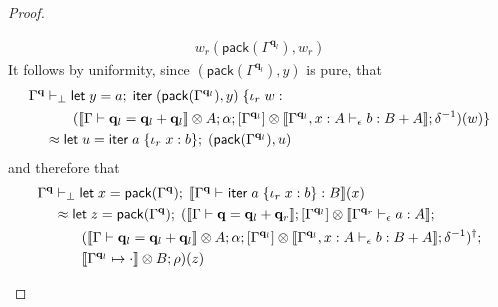 \documentclass[acmsmall,screen,anonymous,review]{acmart}
\newcommand{\mb}[1]{\ensuremath{\mathbf{#1}}}
\newcommand{\ms}[1]{\ensuremath{\mathsf{#1}}}
\newcommand{\lto}{:}
\newcommand{\linr}[1]{\iota_r\;{#1}}
\newcommand{\letexpr}[3]{\ensuremath{\ms{let}\;#1 = #2;\;#3}}
\newcommand{\liter}[3]{\ms{iter}\;#1\;\{ \linr{#2} \lto #3 \}}
\newcommand{\qsp}[4]{#1 \vdash #2 = #3 + #4}
\newcommand{\cwk}[2]{#1 \mapsto #2}
\newcommand{\hasty}[4]{#1 \vdash_{#2} #3: {#4}}
\newcommand{\dnt}[1]{\llbracket{#1}\rrbracket}
\begin{document}
\begin{proof}
\begin{itemize}
\begin{align*}
                       {w_r}{(\ms{pack}(\Gamma^{\mb{q}_l}), w_r)}
    \end{align*}
    It follows by uniformity, since $(\ms{pack}(\Gamma^{\mb{q}_l}), y)$ is pure, that
    \begin{align*}
      \Gamma^{\mb{q}} &\vdash_\bot
      \letexpr{y}{a}{\liter{(\ms{pack}(\Gamma^{\mb{q}_l}), y)}{w}{ \\ & \qquad
        (
          \dnt{\qsp{\Gamma}{\mb{q}_l}{\mb{q}_l}{\mb{q}_l}} \otimes A 
          ; \alpha
          ; [\Gamma^{\mb{q}_l}] 
            \otimes \dnt{\hasty{\Gamma^{\mb{q}_l}, x : A}{\epsilon}{b}{B + A}}
          ; \delta^{-1}
        )(w)
      }} \\
      &\approx
      \letexpr{u}{\liter{a}{x}{b}}{(\ms{pack}(\Gamma^{\mb{q}_l}), u)}
    \end{align*}
    and therefore that
    \begin{align*}
    \Gamma^{\mb{q}} &\vdash_\bot
      \letexpr{x}{\ms{pack}(\Gamma^{\mb{q}})}{\dnt{\hasty{\Gamma^{\mb{q}}}{}{\liter{a}{x}{b}}{B}}(x)}
      \\ &\approx 
      \letexpr{z}{\ms{pack}(\Gamma^{\mb{q}})}
        {(
          \dnt{\qsp{\Gamma}{\mb{q}}{\mb{q}_l}{\mb{q}_r}}
          ; [\Gamma^{\mb{q}_l}] \otimes \dnt{\hasty{\Gamma^{\mb{q}_r}}{\epsilon}{a}{A}}
          ;
      \\ & \qquad    
        (
          \dnt{\qsp{\Gamma}{\mb{q}_l}{\mb{q}_l}{\mb{q}_l}} \otimes A 
          ; \alpha
          ; [\Gamma^{\mb{q}_l}] 
            \otimes \dnt{\hasty{\Gamma^{\mb{q}_l}, x : A}{\epsilon}{b}{B + A}}
          ; \delta^{-1}
        )^\dagger  
        ;
      \\ & \qquad
        \dnt{\cwk{\Gamma^{\mb{q}_l}}{\cdot}} \otimes B
        ; \rho
      )(z)}

\end{align*}
\end{itemize}
\end{proof}
\end{document}
